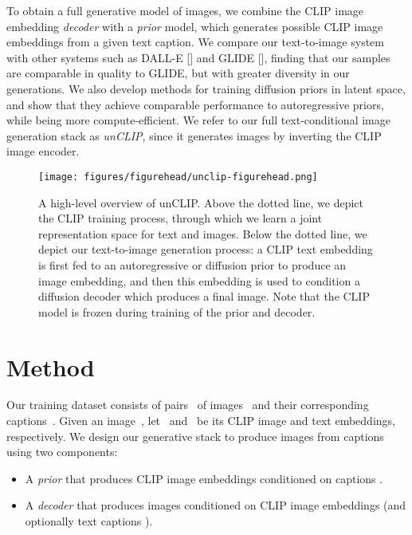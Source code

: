 \documentclass{article}
\newcommand{\shortcite}[1]{[\citenum{#1}]}
\newcommand{\modelname}{unCLIP}
\begin{document}
To obtain a full generative model of images, we combine the CLIP image embedding \textit{decoder} with a \textit{prior} model, which generates possible CLIP image embeddings from a given text caption. We compare our text-to-image system with other systems such as DALL-E \shortcite{dalle} and GLIDE \shortcite{glide}, finding that our samples are comparable in quality to GLIDE, but with greater diversity in our generations. We also develop methods for training diffusion priors in latent space, and show that they achieve comparable performance to autoregressive priors, while being more compute-efficient. We refer to our full text-conditional image generation stack as \textit{\modelname{}}, since it generates images by inverting the CLIP image encoder.

\begin{figure}[t]
    \centering
    \setlength{\tabcolsep}{2.0pt}
    \texttt{[image: figures/figurehead/unclip-figurehead.png]}

    \caption{A high-level overview of \modelname{}. Above the dotted line, we depict the CLIP training process, through which we learn a joint representation space for text and images. Below the dotted line, we depict our text-to-image generation process: a CLIP text embedding is first fed to an autoregressive or diffusion prior to produce an image embedding, and then this embedding is used to condition a diffusion decoder which produces a final image. Note that the CLIP model is frozen during training of the prior and decoder.}
    \label{fig:figurehead}
    \vskip -0.1in 
\end{figure}

\section{Method}
Our training dataset consists of pairs~ of images~ and their corresponding captions~. Given an image~, let~ and~ be its CLIP image and text embeddings, respectively. We design our generative stack to produce images from captions using two components:

\begin{itemize}
    \item A \textit{prior}  that produces CLIP image embeddings  conditioned on captions .
    \item A \textit{decoder}  that produces images  conditioned on CLIP image embeddings  (and optionally text captions ). 
\end{itemize}
\end{document}
